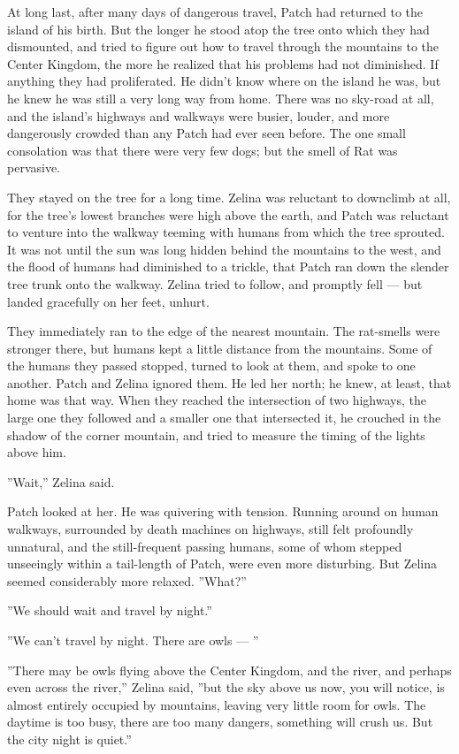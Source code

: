 \documentclass[12pt]{book}
\begin{document}
At long last, after many days of dangerous travel, Patch had returned to the island of his birth. But the longer he stood atop the tree onto which they had dismounted, and tried to figure out how to travel through the mountains to the Center Kingdom, the more he realized that his problems had not diminished. If anything they had proliferated. He didn't know where on the island he was, but he knew he was still a very long way from home. There was no sky-road at all, and the island's highways and walkways were busier, louder, and more dangerously crowded than any Patch had ever seen before. The one small consolation was that there were very few dogs; but the smell of Rat was pervasive.

They stayed on the tree for a long time. Zelina was reluctant to downclimb at all, for the tree's lowest branches were high above the earth, and Patch was reluctant to venture into the walkway teeming with humans from which the tree sprouted. It was not until the sun was long hidden behind the mountains to the west, and the flood of humans had diminished to a trickle, that Patch ran down the slender tree trunk onto the walkway. Zelina tried to follow, and promptly fell ---
but landed gracefully on her feet, unhurt.

They immediately ran to the edge of the nearest mountain. The rat-smells were stronger there, but humans kept a little distance from the mountains. Some of the humans they passed stopped, turned to look at them, and spoke to one another. Patch and Zelina ignored them. He led her north; he knew, at least, that home was that way. When they reached the intersection of two highways, the large one they followed and a smaller one that intersected it, he crouched in the shadow of the corner mountain, and tried to measure the timing of the lights above him.

''Wait,'' Zelina said.

Patch looked at her. He was quivering with tension. Running around on human walkways, surrounded by death machines on highways, still felt profoundly unnatural, and the still-frequent passing humans, some of whom stepped unseeingly within a tail-length of Patch, were even more disturbing. But Zelina seemed considerably more relaxed. ''What?''

''We should wait and travel by night.''

''We can't travel by night. There are owls ---
''

''There may be owls flying above the Center Kingdom, and the river, and perhaps even across the river,'' Zelina said, ''but the sky above us now, you will notice, is almost entirely occupied by mountains, leaving very little room for owls. The daytime is too busy, there are too many dangers, something will crush us. But the city night is quiet.''
\end{document}
